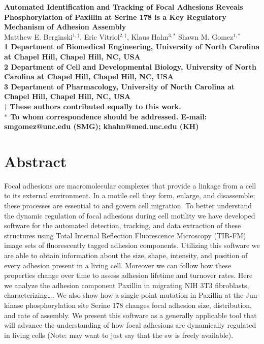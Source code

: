 \documentclass[10pt]{article}
\date{}
\begin{document}
\begin{flushleft}
{\Large
\textbf{Automated Identification and Tracking of Focal Adhesions Reveals Phosphorylation of Paxillin at Serine 178 is a Key Regulatory Mechanism of Adhesion Assembly}
}
\\
Matthew E. Berginski$^{1,\dagger}$, 
Eric Vitriol$^{2,\dagger}$, 
Klaus Hahn$^{3,\ast}$
Shawn M. Gomez$^{1,\ast}$
\\
\bf{1} Department of Biomedical Engineering, University of North Carolina at Chapel Hill, Chapel Hill, NC, USA
\\
\bf{2} Department of Cell and Developmental Biology, University of North Carolina at Chapel Hill, Chapel Hill, NC, USA
\\
\bf{3} Department of Pharmacology, University of North Carolina at Chapel Hill, Chapel Hill, NC, USA
\\
$\dagger$ These authors contributed equally to this work.
\\
$\ast$ To whom correspondence should be addressed. E-mail: smgomez@unc.edu (SMG); khahn@med.unc.edu (KH)
\end{flushleft}

\section*{Abstract}

Focal adhesions are macromolecular complexes that provide a linkage from a cell
to its external environment. In a motile cell they form, enlarge, and
disassemble; these processes are essential to and govern cell migration. To
better understand the dynamic regulation of focal adhesions during cell motility
we have developed software for the automated detection, tracking, and data
extraction of these structures using Total Internal Reflection Fluorescence
Microscopy (TIR-FM) image sets of fluorescently tagged adhesion components.
Utilizing this software we are able to obtain information about the size, shape,
intensity, and position of every adhesion present in a living cell. Moreover we
can follow how these properties change over time to assess adhesion lifetime and
turnover rates. Here we analyze the adhesion component Paxillin in migrating NIH
3T3 fibroblasts, characterizing\ldots. We also show how a single point mutation in Paxillin at the
Jun-kinase phosphorylation site Serine 178 changes focal adhesion size,
distribution, and rate of assembly. We present this software as a generally
applicable tool that will advance the understanding of how focal adhesions are
dynamically regulated in living cells (Note: may want to just say that the sw is freely available).
\end{document}
